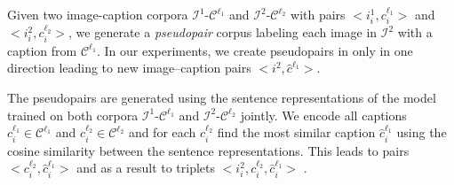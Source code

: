 \begin{comment}
Given two corpora $\mathcal{D}_1$ and $\mathcal{D}_2$, where $\mathcal{D}_1$ contains $<i_1, c_1>$ and $<i_2, c_2>$ pairs, and $\mathcal{D}_2$ contains $<i_2, c_1>$ pairs, we generate a \emph{pseudo-pair} corpora with noisy image-sentence pairs extracted from $D_1$. %
In this paper, we create pseudo-pairs
in one direction $\mathcal{D}_1 \rightarrow \mathcal{D}_2$ leading 
to new image--caption pairs $<i_2, \hat{c}_2>$ for $\mathcal{D}_2$. 
We generate these pseudo-pairs using the cosine similarity between
sentence embeddings using a model trained on the $\mathcal{D}_1$ data. 
When generating 
pseudo-pairs $\mathcal{D}_1 \rightarrow \mathcal{D}_2$, we encode all 
captions $c_1 \in \mathcal{D}_2$ using the model trained on $\mathcal{D}_1$, and transfer the most similar $\hat{c}_2$ caption 
from $\mathcal{D}_1$ as its pair. This leads to $<c_2, c_1>$ pairs, and as a consequence to $<i_2, \hat{c}_2>$ pairs, and ultimately in a $\mathcal{D}_2$ corpus that contains $<i_1, c_1>$ and $<i_2, \hat{c_2}>$ pairs.
\end{comment}

Given two image-caption corpora  $\mathcal{I}^1$-$\mathcal{C}^{\ell_1}$  and  $\mathcal{I}^2$-$\mathcal{C}^{\ell_2}$ with pairs 
$<i^1_i, c^{\ell_1}_i>$ and $<i^2_i, c^{\ell_2}_i>$, we generate a \emph{pseudopair} corpus labeling each image in $\mathcal{I}^2$ with 
a caption from $\mathcal{C}^{\ell_1}$.
In our experiments, we create pseudopairs
in only in one direction  leading 
to new image--caption pairs $<i^2, \hat{c}^{\ell_1}>$. 

The pseudopairs are generated using the sentence representations of
the model trained on both corpora  $\mathcal{I}^1$-$\mathcal{C}^{\ell_1}$
and $\mathcal{I}^2$-$\mathcal{C}^{\ell_2}$ jointly. 
We encode all 
captions $c^{\ell_1}_i \in \mathcal{C}^{\ell_1}$ and 
 $c^{\ell_2}_i \in \mathcal{C}^{\ell_2}$ and for each $c^{\ell_2}_i$
find the most similar caption $\hat{c}^{\ell_1}_i$ using the cosine similarity between the sentence representations.
This leads to pairs $<c^{\ell_2}_i, \hat{c}^{\ell_1}_i>$ 
and as a result to triplets $<i^2_i, c^{\ell_2}_i, \hat{c}^{\ell_1}_i>$ .



\begin{comment}


This is summarized in Algorithm~\ref{alg:sentsim}.

\begin{algorithm}
\begin{algorithmic}
\State $pseudo\_caps \Leftarrow [\;]$
\For{$c_2 \in D_2$} 
    \State $\hat{c_2}$ = arg max $sim(c_1, C_1)$
    \State $pseudo\_caps$.add($\hat{c_2}$)
\EndFor
\end{algorithmic}
\caption{Pseudo-pairs based on sentence-similarities.}
\label{alg:sentsim}
\end{algorithm}
\end{comment}

